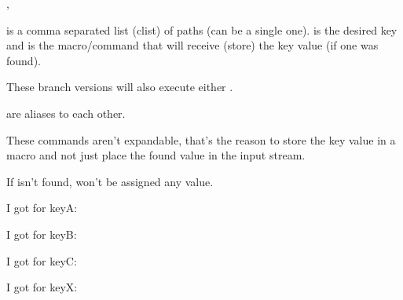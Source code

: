 \documentclass[10pt]{article}
\begin{document}
\begin{codedescribe}[code,update=2024/01/11]{\pgfkeysearchvalueofTF,\pgfkeysearchTF}
\begin{codesyntax}%
\end{codesyntax}
 is a comma separated list (clist) of paths (can be a single one).  is the desired key and  is the macro/command that will receive (store) the key value (if one was found).

These branch versions will also execute either .
  
\end{codedescribe}
\begin{tsremark}
\tsobj{\pgfkeysearchvalueofTF,\pgfkeysearchTF}  are aliases to each other.
\end{tsremark}
\begin{tsremark}
  These commands aren't expandable, that's the reason to store the key value in a macro and not just place the found value in the input stream.
\end{tsremark}
\begin{tsremark}
  If  isn't found,  won't be assigned any value.
\end{tsremark}


\begin{codestore}
\end{codestore}

\begin{codestore}
\end{codestore}


\begin{codestore}
 I got for keyA: \textbf{\VALkeyA} \par
 I got for keyB: \textbf{\VALkeyB} \par
 I got for keyC: \textbf{\VALkeyC} \par
 I got for keyX: \textbf{\VALkeyX} \par
\end{codestore}
\end{document}
